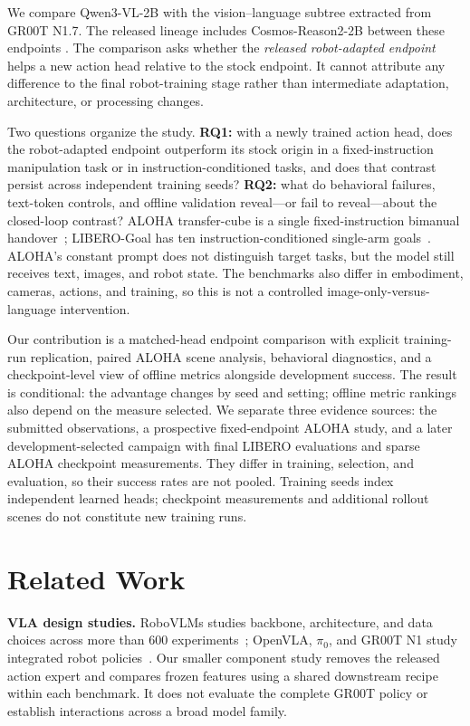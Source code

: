 \documentclass[conference]{IEEEtran}
\newcommand{\groot}{GR00T N1.7}
\newcommand{\qwen}{Qwen3-VL-2B}
\begin{document}
We compare \qwen{} with the vision--language subtree extracted from \groot{}.
The released lineage includes Cosmos-Reason2-2B between these endpoints
\cite{groot17}. The comparison asks whether the \emph{released robot-adapted
endpoint} helps a new action head relative to the stock endpoint. It cannot
attribute any difference to the final robot-training stage rather than
intermediate adaptation, architecture, or processing changes.

Two questions organize the study. \textbf{RQ1:} with a newly trained action
head, does the robot-adapted endpoint outperform its stock origin in a
fixed-instruction manipulation task or in instruction-conditioned tasks,
and does that contrast persist across independent training seeds?
\textbf{RQ2:} what do behavioral failures, text-token controls, and offline
validation reveal---or fail to reveal---about the closed-loop contrast?
ALOHA transfer-cube is a single fixed-instruction bimanual handover~\cite{aloha};
LIBERO-Goal has ten instruction-conditioned single-arm goals~\cite{libero}.
ALOHA's constant prompt does not distinguish target tasks, but the model
still receives text, images, and robot state. The benchmarks also differ in
embodiment, cameras, actions, and training, so this is not a controlled
image-only-versus-language intervention.

Our contribution is a matched-head endpoint comparison with explicit
training-run replication, paired ALOHA scene analysis, behavioral diagnostics,
and a checkpoint-level view of offline metrics alongside development success.
The result is conditional: the advantage changes by seed and setting; offline
metric rankings also depend on the measure selected.
We separate three evidence sources: the submitted observations, a prospective
fixed-endpoint ALOHA study, and a later development-selected campaign with
final LIBERO evaluations and sparse ALOHA checkpoint measurements. They differ
in training, selection, and evaluation, so their success rates are not pooled.
Training seeds index independent learned heads; checkpoint measurements and
additional rollout scenes do not constitute new training runs.

\IEEEpubidadjcol
\section{Related Work}
\textbf{VLA design studies.} RoboVLMs studies backbone, architecture, and data
choices across more than 600 experiments~\cite{robovlms}; OpenVLA, $\pi_0$, and
GR00T N1 study integrated robot policies~\cite{openvla,pi0,grootn1}. Our smaller
component study removes the released action expert and compares frozen features
using a shared downstream recipe within each benchmark. It does not evaluate
the complete GR00T policy or establish interactions across a broad model family.
\end{document}

